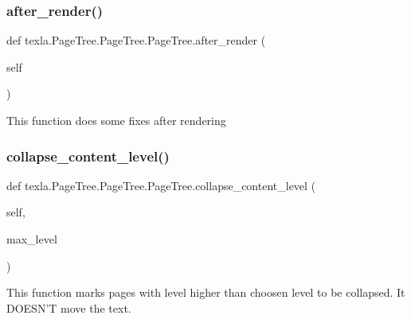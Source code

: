 \subsubsection{\texorpdfstring{after\+\_\+render()}{after\_render()}}
{\footnotesize\ttfamily def texla.\+Page\+Tree.\+Page\+Tree.\+Page\+Tree.\+after\+\_\+render (\begin{DoxyParamCaption}\item[{}]{self }\end{DoxyParamCaption})}

\begin{DoxyVerb}This function does some fixes after rendering\end{DoxyVerb}
 \hypertarget{classtexla_1_1PageTree_1_1PageTree_1_1PageTree_af7af6e47f12cf9a4b37b6d3109bf6b63}{}\label{classtexla_1_1PageTree_1_1PageTree_1_1PageTree_af7af6e47f12cf9a4b37b6d3109bf6b63} 
\subsubsection{\texorpdfstring{collapse\+\_\+content\+\_\+level()}{collapse\_content\_level()}}
{\footnotesize\ttfamily def texla.\+Page\+Tree.\+Page\+Tree.\+Page\+Tree.\+collapse\+\_\+content\+\_\+level (\begin{DoxyParamCaption}\item[{}]{self,  }\item[{}]{max\+\_\+level }\end{DoxyParamCaption})}

\begin{DoxyVerb}This function marks pages with level higher than
choosen level to be collapsed. It DOESN'T move the text.\end{DoxyVerb}
 \hypertarget{classtexla_1_1PageTree_1_1PageTree_1_1PageTree_ac4014d964d66c7a28b6ad2817c627bfd}{}\label{classtexla_1_1PageTree_1_1PageTree_1_1PageTree_ac4014d964d66c7a28b6ad2817c627bfd} 
